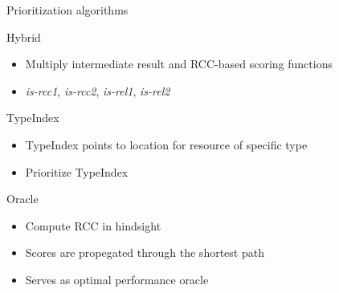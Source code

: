 \begin{frame}{Prioritization algorithms}
  \begin{block}{Hybrid}
        \begin{itemize}
        \item Multiply intermediate result and RCC-based scoring functions
        \item \emph{is-rcc1}, \emph{is-rcc2}, \emph{is-rel1}, \emph{is-rel2} 
    \end{itemize}
  \end{block}
  \begin{block}{TypeIndex}
        \begin{itemize}
        \item TypeIndex points to location for resource of specific type
        \item Prioritize TypeIndex
    \end{itemize}
  \end{block}
  \begin{block}{Oracle}
        \begin{itemize}
        \item Compute RCC in hindsight
        \item Scores are propegated through the shortest path
        \item Serves as optimal performance oracle
    \end{itemize}
  \end{block}

\end{frame}

